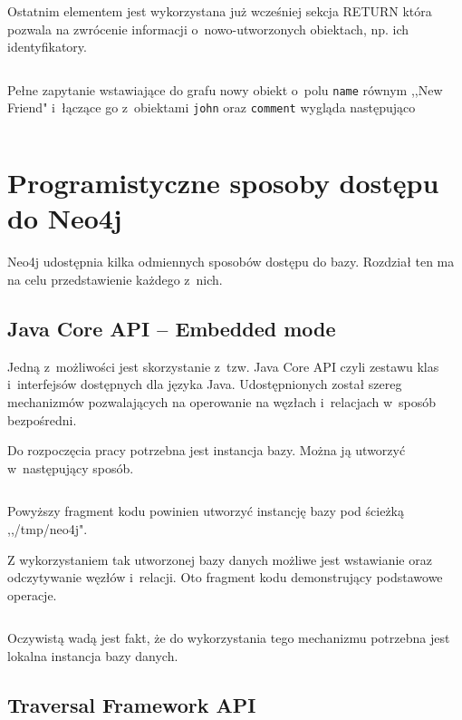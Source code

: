 \documentclass[brudnopis]{xmgr}
\begin{document}
\inputminted{cypher}{listings/cypher/create-section.cypher}

Ostatnim elementem jest wykorzystana już wcześniej sekcja RETURN która pozwala na zwrócenie informacji o~nowo-utworzonych obiektach, np. ich identyfikatory.

\inputminted{cypher}{listings/cypher/return-section-2.cypher}

Pełne zapytanie wstawiające do grafu nowy obiekt o~polu \texttt{name} równym ,,New Friend" i~łączące go z~obiektami \texttt{john} oraz \texttt{comment} wygląda następująco

\inputminted{cypher}{listings/cypher/sample-create-query.cypher}

\section{Programistyczne sposoby dostępu do Neo4j}

Neo4j udostępnia kilka odmiennych sposobów dostępu do bazy. Rozdział ten ma na celu przedstawienie każdego z~nich.

\subsection{Java Core API -- Embedded mode}

Jedną z~możliwości jest skorzystanie z~tzw. Java Core API czyli zestawu klas i~interfejsów dostępnych dla języka Java. Udostępnionych został szereg mechanizmów pozwalających na operowanie na węzłach i~relacjach w~sposób bezpośredni.

\medskip\noindent Do rozpoczęcia pracy potrzebna jest instancja bazy. Można ją utworzyć w~następujący sposób.

\inputminted{java}{listings/java/neo4j-core-api-dbcreate.java}

Powyższy fragment kodu powinien utworzyć instancję bazy pod ścieżką ,,/tmp/neo4j".

Z wykorzystaniem tak utworzonej bazy danych możliwe jest wstawianie oraz odczytywanie węzłów i~relacji. Oto fragment kodu demonstrujący podstawowe operacje.

\inputminted{java}{listings/java/neo4j-core-api-use.java}

Oczywistą wadą jest fakt, że do wykorzystania tego mechanizmu potrzebna jest lokalna instancja bazy danych.

\subsection{Traversal Framework API}
\end{document}
